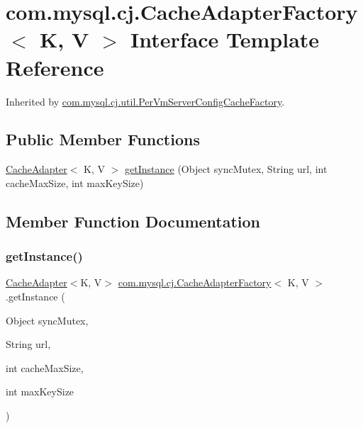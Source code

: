 \hypertarget{interfacecom_1_1mysql_1_1cj_1_1_cache_adapter_factory}{}\section{com.\+mysql.\+cj.\+Cache\+Adapter\+Factory$<$ K, V $>$ Interface Template Reference}
\label{interfacecom_1_1mysql_1_1cj_1_1_cache_adapter_factory}


Inherited by \mbox{\hyperlink{classcom_1_1mysql_1_1cj_1_1util_1_1_per_vm_server_config_cache_factory}{com.\+mysql.\+cj.\+util.\+Per\+Vm\+Server\+Config\+Cache\+Factory}}.

\subsection*{Public Member Functions}
\begin{DoxyCompactItemize}
\item 
\mbox{\hyperlink{interfacecom_1_1mysql_1_1cj_1_1_cache_adapter}{Cache\+Adapter}}$<$ K, V $>$ \mbox{\hyperlink{interfacecom_1_1mysql_1_1cj_1_1_cache_adapter_factory_a6043b2a41c4d79f8a55b11489bf2b0ab}{get\+Instance}} (Object sync\+Mutex, String url, int cache\+Max\+Size, int max\+Key\+Size)
\end{DoxyCompactItemize}


\subsection{Member Function Documentation}
\mbox{\label{interfacecom_1_1mysql_1_1cj_1_1_cache_adapter_factory_a6043b2a41c4d79f8a55b11489bf2b0ab}} 
\subsubsection{\texorpdfstring{get\+Instance()}{getInstance()}}
{\footnotesize\ttfamily \mbox{\hyperlink{interfacecom_1_1mysql_1_1cj_1_1_cache_adapter}{Cache\+Adapter}}$<$K, V$>$ \mbox{\hyperlink{interfacecom_1_1mysql_1_1cj_1_1_cache_adapter_factory}{com.\+mysql.\+cj.\+Cache\+Adapter\+Factory}}$<$ K, V $>$.get\+Instance (\begin{DoxyParamCaption}\item[{Object}]{sync\+Mutex,  }\item[{String}]{url,  }\item[{int}]{cache\+Max\+Size,  }\item[{int}]{max\+Key\+Size }\end{DoxyParamCaption})}



